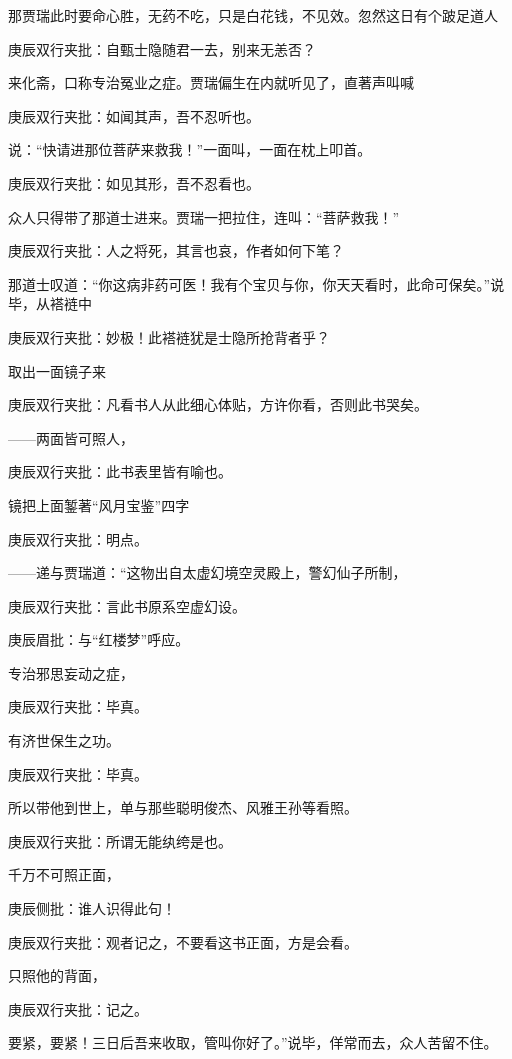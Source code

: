 \begin{parag}


    那贾瑞此时要命心胜，无药不吃，只是白花钱，不见效。忽然这日有个跛足道人\begin{note}庚辰双行夹批：自甄士隐随君一去，别来无恙否？\end{note}来化斋，口称专治冤业之症。贾瑞偏生在内就听见了，直著声叫喊\begin{note}庚辰双行夹批：如闻其声，吾不忍听也。\end{note}说：“快请进那位菩萨来救我！”一面叫，一面在枕上叩首。\begin{note}庚辰双行夹批：如见其形，吾不忍看也。\end{note}众人只得带了那道士进来。贾瑞一把拉住，连叫：“菩萨救我！”\begin{note}庚辰双行夹批：人之将死，其言也哀，作者如何下笔？\end{note}那道士叹道：“你这病非药可医！我有个宝贝与你，你天天看时，此命可保矣。”说毕，从褡裢中\begin{note}庚辰双行夹批：妙极！此褡裢犹是士隐所抢背者乎？\end{note}取出一面镜子来\begin{note}庚辰双行夹批：凡看书人从此细心体贴，方许你看，否则此书哭矣。\end{note}——两面皆可照人，\begin{note}庚辰双行夹批：此书表里皆有喻也。\end{note}镜把上面錾著“风月宝鉴”四字\begin{note}庚辰双行夹批：明点。\end{note}——递与贾瑞道：“这物出自太虚幻境空灵殿上，警幻仙子所制，\begin{note}庚辰双行夹批：言此书原系空虚幻设。\end{note}\begin{note}庚辰眉批：与“红楼梦”呼应。\end{note}专治邪思妄动之症，\begin{note}庚辰双行夹批：毕真。\end{note}有济世保生之功。\begin{note}庚辰双行夹批：毕真。\end{note}所以带他到世上，单与那些聪明俊杰、风雅王孙等看照。\begin{note}庚辰双行夹批：所谓无能纨绔是也。\end{note}千万不可照正面，\begin{note}庚辰侧批：谁人识得此句！\end{note}\begin{note}庚辰双行夹批：观者记之，不要看这书正面，方是会看。\end{note}只照他的背面，\begin{note}庚辰双行夹批：记之。\end{note}要紧，要紧！三日后吾来收取，管叫你好了。”说毕，佯常而去，众人苦留不住。
\end{parag}


